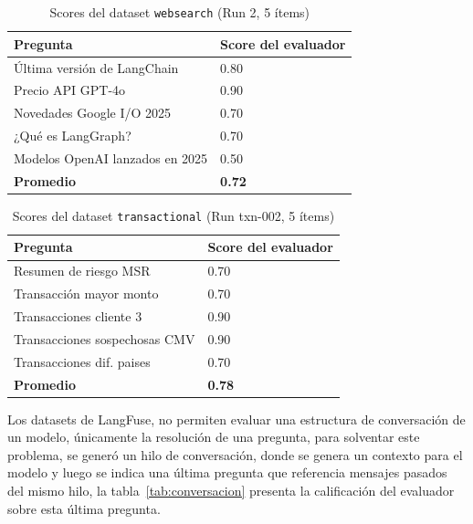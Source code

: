 \documentclass[conference]{IEEEtran}
\begin{document}
\begin{table}[htbp]
\caption{Scores del dataset \texttt{websearch} (Run 2, 5 ítems)}
\label{tab:websearch}
\centering
\begin{tabular}{p{3.5cm}p{3.2cm}}
\toprule
\textbf{Pregunta} & \textbf{Score del evaluador} \\
\midrule
Última versión de LangChain       & 0.80 \\
Precio API GPT-4o                 & 0.90 \\
Novedades Google I/O 2025         & 0.70 \\
¿Qué es LangGraph?                & 0.70 \\
Modelos OpenAI lanzados en 2025   & 0.50 \\
\midrule
\textbf{Promedio}                 & \textbf{0.72} \\
\bottomrule
\end{tabular}
\end{table}

\begin{table}[htbp]
\caption{Scores del dataset \texttt{transactional} (Run txn-002, 5 ítems)}
\label{tab:transactional}
\centering
\begin{tabular}{p{3.5cm}p{3.2cm}}
\toprule
\textbf{Pregunta} & \textbf{Score del evaluador} \\
\midrule
Resumen de riesgo MSR             & 0.70 \\
Transacción mayor monto           & 0.70 \\
Transacciones cliente 3           & 0.90 \\
Transacciones sospechosas CMV     & 0.90 \\
Transacciones dif. paises         & 0.70 \\
\midrule
\textbf{Promedio}                 & \textbf{0.78} \\
\bottomrule
\end{tabular}
\end{table}

Los datasets de LangFuse, no permiten evaluar una estructura de conversación de un modelo, únicamente la resolución de una pregunta, para solventar este problema, se generó un hilo de conversación, donde se genera un contexto para el modelo y luego se indica una última pregunta que referencia mensajes pasados del mismo hilo, la tabla~\ref{tab:conversacion} presenta la calificación del evaluador sobre esta última pregunta.
\end{document}
